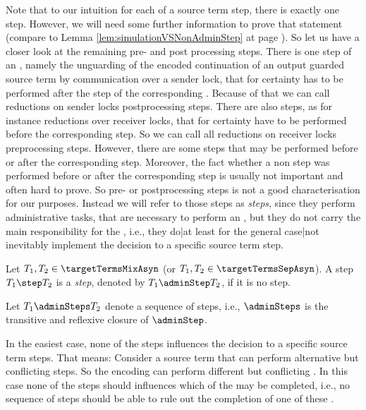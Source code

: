 \documentclass[]{llncs}
\begin{document}
Note that to our intuition for each \simulation of a source term step, there is exactly one \nonAdmin step. However, we will need some further information to prove that statement (compare to Lemma \ref{lem:simulationVSNonAdminStep} at page \pageref{lem:simulationVSNonAdminStep}). So let us have a closer look at the remaining pre- and post processing steps. There is one step of an \simulation, namely the unguarding of the encoded continuation of an output guarded source term by communication over a sender lock, that for certainty has to be performed after the \nonAdmin step of the corresponding \simulation. Because of that we can call reductions on sender locks postprocessing steps. There are also steps, as for instance reductions over receiver locks, that for certainty have to be performed before the corresponding \nonAdmin step. So we can call all reductions on receiver locks preprocessing steps. However, there are some steps that may be performed before or after the corresponding \nonAdmin step. Moreover, the fact whether a non \nonAdmin step was performed before or after the corresponding \nonAdmin step is usually not important and often hard to prove. So pre- or postprocessing steps is not a good characterisation for our purposes. Instead we will refer to those steps as \emph{\admin steps}, since they perform administrative tasks, that are necessary to perform an \simulation, but they do not carry the main responsibility for the \simulation, i.e., they do|at least for the general case|not inevitably implement the decision to \simulate a specific source term step.

\begin{definition} \label{def:adminStep}
	Let $ T_1, T_2 \in \targetTermsMixAsyn $ (or $ T_1, T_2 \in \targetTermsSepAsyn $). A step $ T_1 \step T_2 $ is a \emph{\admin step}, denoted by $ T_1 \adminStep T_2 $, if it is no \nonAdmin step.
	
	Let $ T_1 \adminSteps T_2 $ denote a sequence of \admin steps, i.e., $ \adminSteps $ is the transitive and reflexive closure of $ \adminStep $.
\end{definition}

In the easiest case, none of the \admin steps influences the decision to \simulate a specific source term steps. That means: Consider a source term that can perform alternative but conflicting steps. So the encoding can perform different but conflicting \simulations. In this case none of the \admin steps should influences which of the \simulations may be completed, i.e., no sequence of \admin steps should be able to rule out the completion of one of these \simulations.
\end{document}
